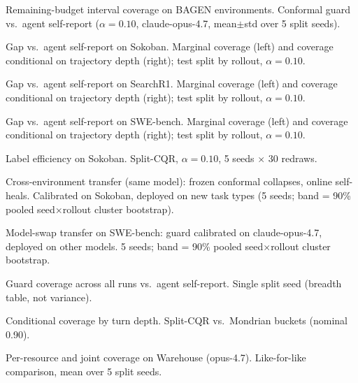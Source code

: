 %

\caption{Remaining-budget interval coverage on BAGEN environments.
Conformal guard vs.\ agent self-report ($\alpha=0.10$, claude-opus-4.7, mean$\pm$std over 5 split seeds).}

\caption{Gap vs.\ agent self-report on Sokoban.
Marginal coverage (left) and coverage conditional on trajectory depth (right); test split by rollout, $\alpha=0.10$.}

\caption{Gap vs.\ agent self-report on SearchR1.
Marginal coverage (left) and coverage conditional on trajectory depth (right); test split by rollout, $\alpha=0.10$.}

\caption{Gap vs.\ agent self-report on SWE-bench.
Marginal coverage (left) and coverage conditional on trajectory depth (right); test split by rollout, $\alpha=0.10$.}

\caption{Label efficiency on Sokoban.
Split-CQR, $\alpha=0.10$, 5 seeds $\times$ 30 redraws.}

\caption{Cross-environment transfer (same model): frozen conformal collapses, online self-heals.
Calibrated on Sokoban, deployed on new task types (5 seeds; band = 90\% pooled seed$\times$rollout cluster bootstrap).}

\caption{Model-swap transfer on SWE-bench: guard calibrated on claude-opus-4.7, deployed on other models.
5 seeds; band = 90\% pooled seed$\times$rollout cluster bootstrap.}

\caption{Guard coverage across all runs vs.\ agent self-report.
Single split seed (breadth table, not variance).}

\caption{Conditional coverage by turn depth.
Split-CQR vs.\ Mondrian buckets (nominal 0.90).}

\caption{Per-resource and joint coverage on Warehouse (opus-4.7).
Like-for-like comparison, mean over 5 split seeds.}

